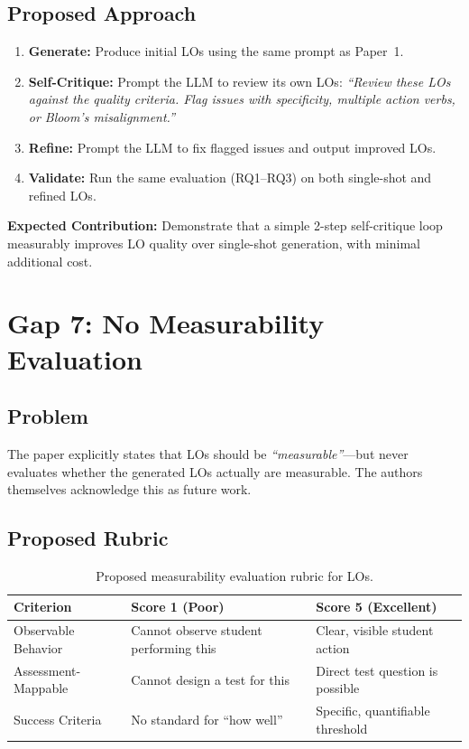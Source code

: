 \documentclass[11pt,a4paper]{article}
\begin{document}
\subsection{Proposed Approach}
\begin{enumerate}[nosep]
    \item \textbf{Generate:} Produce initial LOs using the same prompt as Paper~1.
    \item \textbf{Self-Critique:} Prompt the LLM to review its own LOs: \textit{``Review these LOs against the quality criteria. Flag issues with specificity, multiple action verbs, or Bloom's misalignment.''}
    \item \textbf{Refine:} Prompt the LLM to fix flagged issues and output improved LOs.
    \item \textbf{Validate:} Run the same evaluation (RQ1--RQ3) on both single-shot and refined LOs.
\end{enumerate}

\begin{notebox}
\textbf{Expected Contribution:} Demonstrate that a simple 2-step self-critique loop measurably improves LO quality over single-shot generation, with minimal additional cost.
\end{notebox}

\section{Gap 7: No Measurability Evaluation}

\subsection{Problem}
The paper explicitly states that LOs should be \textit{``measurable''}---but never evaluates whether the generated LOs actually are measurable. The authors themselves acknowledge this as future work.

\subsection{Proposed Rubric}

\begin{table}[H]
\centering
\caption{Proposed measurability evaluation rubric for LOs.}
\label{tab:measurability}
\begin{tabular}{@{}lp{4.5cm}p{4.5cm}@{}}
\toprule
\textbf{Criterion} & \textbf{Score 1 (Poor)} & \textbf{Score 5 (Excellent)} \\
\midrule
Observable Behavior & Cannot observe student performing this & Clear, visible student action \\
Assessment-Mappable & Cannot design a test for this & Direct test question is possible \\
Success Criteria & No standard for ``how well'' & Specific, quantifiable threshold \\
\bottomrule
\end{tabular}
\end{table}
\end{document}
